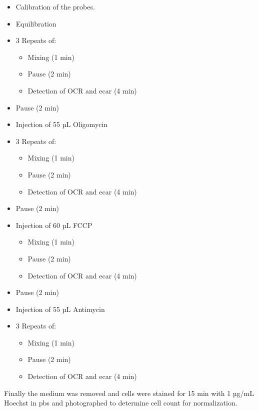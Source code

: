     \begin{itemize}
        \item Calibration of the probes.
        \item Equilibration
        \item 3 Repeats of:
        \begin{itemize}
            \item Mixing (1 min)
            \item Pause (2 min)
            \item Detection of OCR and \ac{ecar} (4 min)
        \end{itemize}
        \item Pause (2 min)
        \item Injection of 55 µL Oligomycin
        \item 3 Repeats of:
        \begin{itemize}
            \item Mixing (1 min)
            \item Pause (2 min)
            \item Detection of OCR and \ac{ecar} (4 min)
        \end{itemize}
        \item Pause (2 min)
        \item Injection of 60 µL FCCP
        \begin{itemize}
            \item Mixing (1 min)
            \item Pause (2 min)
            \item Detection of OCR and \ac{ecar} (4 min)
        \end{itemize}
        \item Pause (2 min)
        \item Injection of 55 µL Antimycin
        \item 3 Repeats of:
        \begin{itemize}
            \item Mixing (1 min)
            \item Pause (2 min)
            \item Detection of OCR and \ac{ecar} (4 min)
        \end{itemize}
    \end{itemize}

    Finally the medium was removed and cells were stained for 15 min with 1 µg/mL Hoechst in \ac{pbs} and photographed to determine cell count for normalization.

